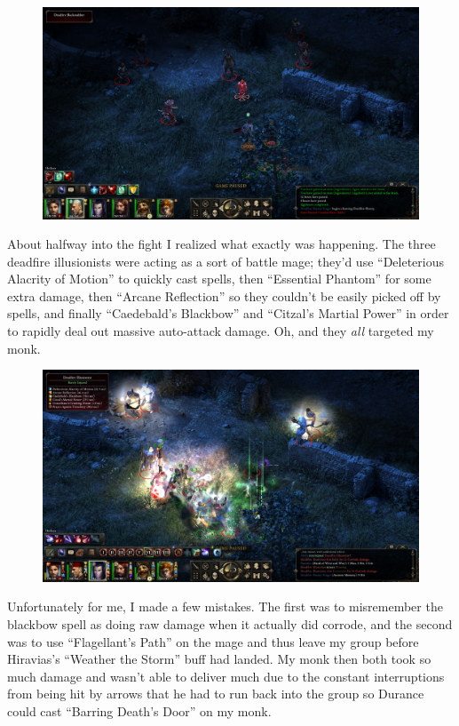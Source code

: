 \documentclass{article}
\begin{document}
\begin{figure}
\includegraphics[scale=0.33]{files/blog/2020_01_18_poe_potd_wmpt2/2020_01_18_bounty4_1.jpg}
\end{figure}

About halfway into the fight I realized what exactly was happening.  The three deadfire illusionists were acting as a sort of battle mage; they'd use ``Deleterious Alacrity of Motion'' to quickly cast spells, then ``Essential Phantom'' for some extra damage, then ``Arcane Reflection'' so they couldn't be easily picked off by spells, and finally ``Caedebald's Blackbow'' and ``Citzal's Martial Power'' in order to rapidly deal out massive auto-attack damage.  Oh, and they \emph{all} targeted my monk.

\begin{figure}
\includegraphics[scale=0.33]{files/blog/2020_01_18_poe_potd_wmpt2/2020_01_18_bounty4_2.jpg}
\end{figure}

Unfortunately for me, I made a few mistakes.  The first was to misremember the blackbow spell as doing raw damage when it actually did corrode, and the second was to use ``Flagellant's Path'' on the mage and thus leave my group before Hiravias's ``Weather the Storm'' buff had landed.  My monk then both took so much damage and wasn't able to deliver much due to the constant interruptions from being hit by arrows that he had to run back into the group so Durance could cast ``Barring Death's Door'' on my monk.
\end{document}
